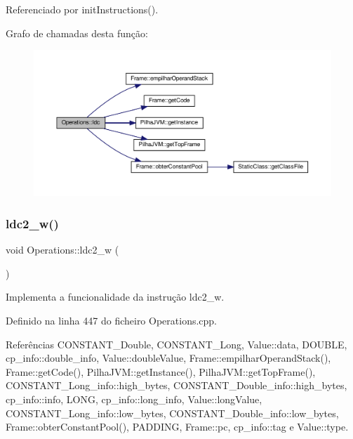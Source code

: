 Referenciado por init\+Instructions().

Grafo de chamadas desta função\+:\nopagebreak
\begin{figure}[H]
\begin{center}
\leavevmode
\includegraphics[width=350pt]{classOperations_aa9a87c1ef4605d0b7b7a99c8d9bc693c_cgraph}
\end{center}
\end{figure}
\mbox{\label{classOperations_ae5f11d6a8ea22b30f316c47af914f05a}} 
\subsubsection{\texorpdfstring{ldc2\+\_\+w()}{ldc2\_w()}}
{\footnotesize\ttfamily void Operations\+::ldc2\+\_\+w (\begin{DoxyParamCaption}{ }\end{DoxyParamCaption})\hspace{0.3cm}{\ttfamily [private]}}



Implementa a funcionalidade da instrução ldc2\+\_\+w. 



Definido na linha 447 do ficheiro Operations.\+cpp.



Referências C\+O\+N\+S\+T\+A\+N\+T\+\_\+\+Double, C\+O\+N\+S\+T\+A\+N\+T\+\_\+\+Long, Value\+::data, D\+O\+U\+B\+LE, cp\+\_\+info\+::double\+\_\+info, Value\+::double\+Value, Frame\+::empilhar\+Operand\+Stack(), Frame\+::get\+Code(), Pilha\+J\+V\+M\+::get\+Instance(), Pilha\+J\+V\+M\+::get\+Top\+Frame(), C\+O\+N\+S\+T\+A\+N\+T\+\_\+\+Long\+\_\+info\+::high\+\_\+bytes, C\+O\+N\+S\+T\+A\+N\+T\+\_\+\+Double\+\_\+info\+::high\+\_\+bytes, cp\+\_\+info\+::info, L\+O\+NG, cp\+\_\+info\+::long\+\_\+info, Value\+::long\+Value, C\+O\+N\+S\+T\+A\+N\+T\+\_\+\+Long\+\_\+info\+::low\+\_\+bytes, C\+O\+N\+S\+T\+A\+N\+T\+\_\+\+Double\+\_\+info\+::low\+\_\+bytes, Frame\+::obter\+Constant\+Pool(), P\+A\+D\+D\+I\+NG, Frame\+::pc, cp\+\_\+info\+::tag e Value\+::type.



